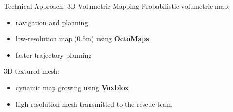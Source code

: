 \documentclass[10pt]{beamer}
\begin{document}
    \begin{frame}{Technical Approach: 3D Volumetric Mapping}
        Probabilistic volumetric map:
        \begin{itemize}
            \item navigation and planning
            \item low-resolution map ($0.5$m) using \textbf{OctoMaps}
            \item faster trajectory planning
        \end{itemize}

        3D textured mesh:
        \begin{itemize}
            \item dynamic map growing using \textbf{Voxblox}
            \item high-resolution mesh transmitted to the rescue team
        \end{itemize}
    \end{frame}
\end{document}
